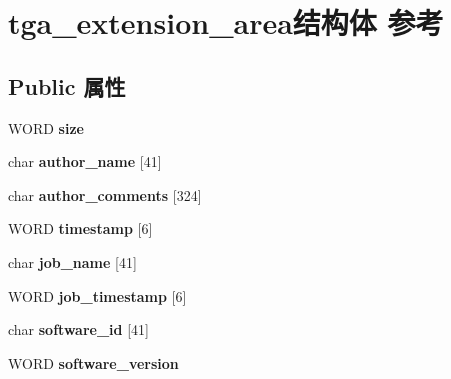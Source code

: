 \hypertarget{structtga__extension__area}{}\section{tga\+\_\+extension\+\_\+area结构体 参考}
\label{structtga__extension__area}
\subsection*{Public 属性}
\begin{DoxyCompactItemize}
\item 
\mbox{\label{structtga__extension__area_a7218d4d6d19d5ac1e25700cc70eea20e}} 
W\+O\+RD {\bfseries size}
\item 
\mbox{\label{structtga__extension__area_a04a4bf0252f13ddb806acd16566c7335}} 
char {\bfseries author\+\_\+name} \mbox{[}41\mbox{]}
\item 
\mbox{\label{structtga__extension__area_ae22b42452a3cbbd541cfa5935ece8b1f}} 
char {\bfseries author\+\_\+comments} \mbox{[}324\mbox{]}
\item 
\mbox{\label{structtga__extension__area_a5c3c81da01dd1b68f42e93f3845aff82}} 
W\+O\+RD {\bfseries timestamp} \mbox{[}6\mbox{]}
\item 
\mbox{\label{structtga__extension__area_ace742894d1649018893df0bc8031c9d2}} 
char {\bfseries job\+\_\+name} \mbox{[}41\mbox{]}
\item 
\mbox{\label{structtga__extension__area_ad30bbead61b5cd8149925a426e8ddcdb}} 
W\+O\+RD {\bfseries job\+\_\+timestamp} \mbox{[}6\mbox{]}
\item 
\mbox{\label{structtga__extension__area_a286f4f27486bcbb140a3cbfc00b8ac07}} 
char {\bfseries software\+\_\+id} \mbox{[}41\mbox{]}
\item 
\mbox{\label{structtga__extension__area_ab2d9794b3437651346bfd4b8c8e736c7}} 
W\+O\+RD {\bfseries software\+\_\+version}
\item 

\end{DoxyCompactItemize}
